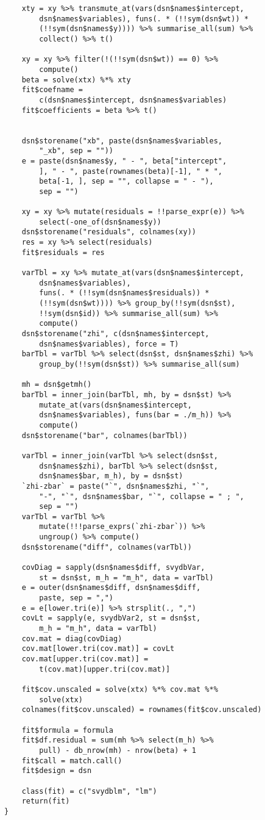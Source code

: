 \begin{lstlisting}
    xty = xy %>% transmute_at(vars(dsn$names$intercept, 
        dsn$names$variables), funs(. * (!!sym(dsn$wt)) * 
        (!!sym(dsn$names$y)))) %>% summarise_all(sum) %>% 
        collect() %>% t()
    
    xy = xy %>% filter(!(!!sym(dsn$wt)) == 0) %>% 
        compute()
    beta = solve(xtx) %*% xty
    fit$coefname = 
        c(dsn$names$intercept, dsn$names$variables)
    fit$coefficients = beta %>% t()
    
    
    dsn$storename("xb", paste(dsn$names$variables, 
        "_xb", sep = ""))
    e = paste(dsn$names$y, " - ", beta["intercept", 
        ], " - ", paste(rownames(beta)[-1], " * ", 
        beta[-1, ], sep = "", collapse = " - "), 
        sep = "")
    
    xy = xy %>% mutate(residuals = !!parse_expr(e)) %>% 
        select(-one_of(dsn$names$y))
    dsn$storename("residuals", colnames(xy))
    res = xy %>% select(residuals)
    fit$residuals = res
    
    varTbl = xy %>% mutate_at(vars(dsn$names$intercept, 
        dsn$names$variables), 
        funs(. * (!!sym(dsn$names$residuals)) * 
        (!!sym(dsn$wt)))) %>% group_by(!!sym(dsn$st), 
        !!sym(dsn$id)) %>% summarise_all(sum) %>% 
        compute()
    dsn$storename("zhi", c(dsn$names$intercept, 
        dsn$names$variables), force = T)
    barTbl = varTbl %>% select(dsn$st, dsn$names$zhi) %>% 
        group_by(!!sym(dsn$st)) %>% summarise_all(sum)
    
    mh = dsn$getmh()
    barTbl = inner_join(barTbl, mh, by = dsn$st) %>% 
        mutate_at(vars(dsn$names$intercept, 
        dsn$names$variables), funs(bar = ./m_h)) %>% 
        compute()
    dsn$storename("bar", colnames(barTbl))
    
    varTbl = inner_join(varTbl %>% select(dsn$st, 
        dsn$names$zhi), barTbl %>% select(dsn$st, 
        dsn$names$bar, m_h), by = dsn$st)
    `zhi-zbar` = paste("`", dsn$names$zhi, "`", 
        "-", "`", dsn$names$bar, "`", collapse = " ; ", 
        sep = "")
    varTbl = varTbl %>% 
        mutate(!!!parse_exprs(`zhi-zbar`)) %>% 
        ungroup() %>% compute()
    dsn$storename("diff", colnames(varTbl))
    
    covDiag = sapply(dsn$names$diff, svydbVar, 
        st = dsn$st, m_h = "m_h", data = varTbl)
    e = outer(dsn$names$diff, dsn$names$diff, 
        paste, sep = ",")
    e = e[lower.tri(e)] %>% strsplit(., ",")
    covLt = sapply(e, svydbVar2, st = dsn$st, 
        m_h = "m_h", data = varTbl)
    cov.mat = diag(covDiag)
    cov.mat[lower.tri(cov.mat)] = covLt
    cov.mat[upper.tri(cov.mat)] = 
        t(cov.mat)[upper.tri(cov.mat)]
    
    fit$cov.unscaled = solve(xtx) %*% cov.mat %*% 
        solve(xtx)
    colnames(fit$cov.unscaled) = rownames(fit$cov.unscaled)
    
    fit$formula = formula
    fit$df.residual = sum(mh %>% select(m_h) %>% 
        pull) - db_nrow(mh) - nrow(beta) + 1
    fit$call = match.call()
    fit$design = dsn
    
    class(fit) = c("svydblm", "lm")
    return(fit)
}
\end{lstlisting}


